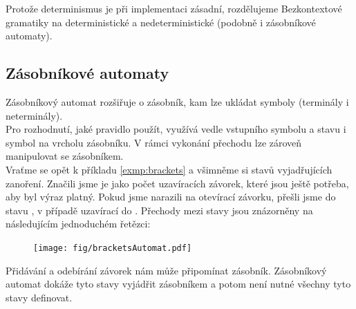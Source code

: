 Protože determinismus je při implementaci zásadní, rozdělujeme Bezkontextové gramatiky
na deterministické a nedeterministické (podobně i zásobníkové automaty).\\


\subsection{Zásobníkové automaty}

Zásobníkový automat rozšiřuje  o zásobník, kam lze
ukládat symboly (terminály i neterminály).\\

Pro rozhodnutí, jaké pravidlo použít,
využívá vedle vstupního symbolu a stavu i symbol na vrcholu zásobníku. V rámci vykonání
přechodu lze zároveň manipulovat se zásobníkem.\\

Vraťme se opět k příkladu \ref{exmp:brackets} a všimněme si stavů
vyjadřujících zanoření. Značili jsme je jako počet uzavíracích závorek,
které jsou ještě potřeba, aby byl výraz platný. Pokud jsme narazili na
otevírací závorku, přešli jsme do stavu , v případě uzavírací
do . Přechody mezi stavy jsou znázorněny na
následujícím jednoduchém řetězci:

\begin{figure}[H]
  \centering
  \texttt{[image: fig/bracketsAutomat.pdf]}
\end{figure}

Přidávání a odebírání závorek nám může připomínat zásobník.
Zásobníkový automat dokáže tyto stavy vyjádřit zásobníkem a potom
není nutné všechny tyto stavy definovat.\\


